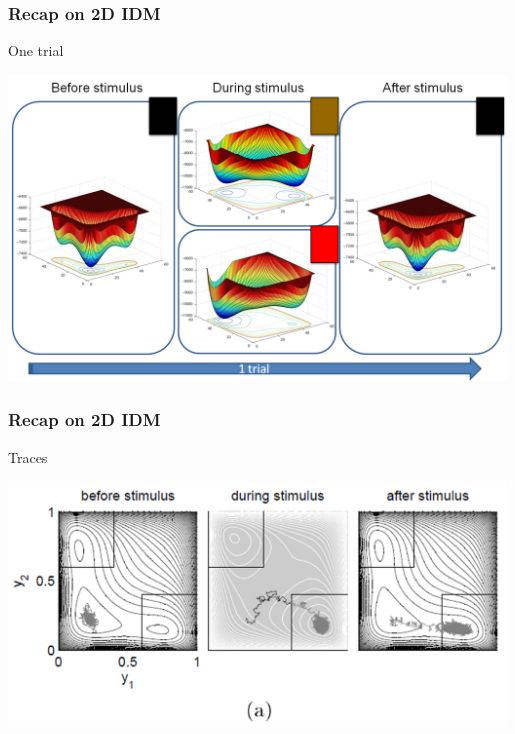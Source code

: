 \documentclass[xcolor={fixpdftex,hyperref,x11names},10pt,pdftex,hyperref={pdftex}]{beamer}
\begin{document}
\begin{frame}
	\frametitle{Recap on 2D IDM}
One trial
    		\begin{center}
			\includegraphics[width=0.99\textwidth]{figs/surface-trial.png}
		\end{center}

\end{frame}


\begin{frame}
	\frametitle{Recap on 2D IDM}
Traces
    		\begin{center}
			\includegraphics[width=0.99\textwidth]{figs/2D-trace.png}
		\end{center}

\end{frame}

\end{document}
